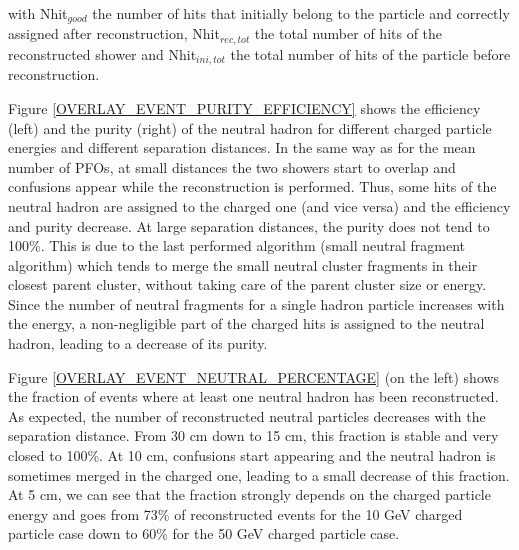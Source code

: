 \documentclass[cits]{JINST}
\begin{document}
with Nhit$_{good}$ the number of hits that initially belong to the particle and correctly assigned after reconstruction, Nhit$_{rec,tot}$ the total number of hits of the reconstructed shower and Nhit$_{ini,tot}$ the total number of hits of the particle before reconstruction. 

Figure \ref{OVERLAY_EVENT_PURITY_EFFICIENCY} shows the efficiency (left) and the purity (right) of the neutral hadron for different charged particle energies and different separation distances. In the same way as for the mean number of PFOs, at small distances the two showers start to overlap and confusions appear while the reconstruction is performed. Thus, some hits of the neutral hadron are assigned to the charged one (and vice versa) and the efficiency and purity decrease. At large separation distances, the purity does not tend to 100\%. This is due to the last performed algorithm (small neutral fragment algorithm) which tends to merge the small neutral cluster fragments in their closest parent cluster, without taking care of the parent cluster size or energy. Since the number of neutral fragments for a single hadron particle increases with the energy, a non-negligible part of the charged hits is assigned to the neutral hadron, leading to a decrease of its purity.

Figure \ref{OVERLAY_EVENT_NEUTRAL_PERCENTAGE} (on the left) shows the fraction of events where at least one neutral hadron has been reconstructed. As expected, the number of reconstructed neutral particles decreases with the separation distance. From 30 cm down to 15 cm, this fraction is stable and very closed to 100\%. At 10 cm, confusions start appearing and the neutral hadron is sometimes merged in the charged one, leading to a small decrease of this fraction. At 5 cm, we can see that the fraction strongly depends on the charged particle energy and goes from 73\% of reconstructed events for the 10 GeV charged particle case down to 60\% for the 50 GeV charged particle case.
\end{document}
